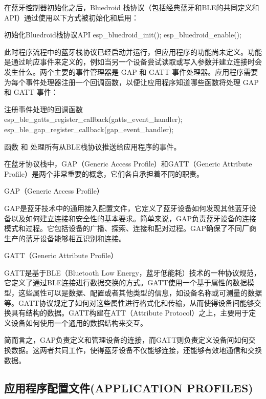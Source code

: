 \documentclass[lang=cn,newtx,10pt,scheme=chinese]{elegantbook}
\begin{document}
在蓝牙控制器初始化之后，Bluedroid 栈协议（包括经典蓝牙和BLE的共同定义和API）通过使用以下方式被初始化和启用：

\begin{mycode}{初始化Bluedroid栈协议API}
esp_bluedroid_init();
esp_bluedroid_enable();
\end{mycode}

此时程序流程中的蓝牙栈协议已经启动并运行，但应用程序的功能尚未定义。功能是通过响应事件来定义的，例如当另一个设备尝试读取或写入参数并建立连接时会发生什么。两个主要的事件管理器是 GAP 和 GATT 事件处理器。应用程序需要为每个事件处理器注册一个回调函数，以便让应用程序知道哪些函数将处理 GAP 和 GATT 事件：

\begin{mycode}{注册事件处理的回调函数}
esp_ble_gatts_register_callback(gatts_event_handler);
esp_ble_gap_register_callback(gap_event_handler);
\end{mycode}

函数  和  处理所有从BLE栈协议推送给应用程序的事件。

\begin{marker}
在蓝牙协议栈中，GAP（Generic Access Profile）和GATT（Generic Attribute Profile）是两个非常重要的概念，它们各自承担着不同的职责。

GAP（Generic Access Profile）

GAP是蓝牙技术中的通用接入配置文件，它定义了蓝牙设备如何发现其他蓝牙设备以及如何建立连接和安全性的基本要求。简单来说，GAP负责蓝牙设备的连接模式和过程。它包括设备的广播、探索、连接和配对过程。GAP确保了不同厂商生产的蓝牙设备能够相互识别和连接。

GATT（Generic Attribute Profile）

GATT是基于BLE（Bluetooth Low Energy，蓝牙低能耗）技术的一种协议规范，它定义了通过BLE连接进行数据交换的方式。GATT使用一个基于属性的数据模型，这些属性可以是数据、配置或者其他类型的信息，如设备名称或可测量的数据等。GATT协议规定了如何对这些属性进行格式化和传输，从而使得设备间能够交换具有结构的数据。GATT构建在ATT（Attribute Protocol）之上，主要用于定义设备如何使用一个通用的数据结构来交互。

简而言之，GAP负责定义和管理设备的连接，而GATT则负责定义设备间如何交换数据。这两者共同工作，使得蓝牙设备不仅能够连接，还能够有效地通信和交换数据。
\end{marker}

\subsection{应用程序配置文件(APPLICATION PROFILES)}
\end{document}
